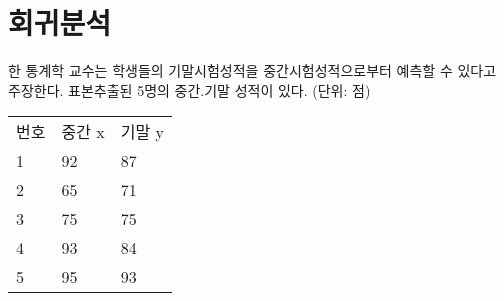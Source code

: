 \section{회귀분석}
한 통계학 교수는 학생들의 기말시험성적을 중간시험성적으로부터
예측할 수 있다고 주장한다. 표본추출된 5명의 중간.기말 성적이
있다. (단위: 점)

\begin{tabularx}{0.9\textwidth}{ X|X|X }
  번호 & 중간 x & 기말 y \\
  \noalign{\smallskip}\hline\noalign{\smallskip}
  1 & 92 & 87 \\
  2 & 65 & 71 \\
  3 & 75 & 75 \\
  4 & 93 & 84 \\
  5 & 95 & 93
\end{tabularx}

